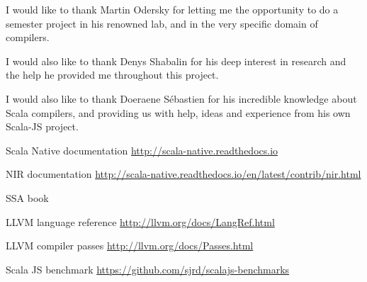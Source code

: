 \documentclass[12pt,a4paper]{article}
\begin{document}
I would like to thank Martin Odersky for letting me the opportunity to do a semester project in his renowned lab, and in the very specific domain of compilers.

I would also like to thank Denys Shabalin for his deep interest in research and the help he provided me throughout this project.

I would also like to thank Doeraene Sébastien for his incredible knowledge about Scala compilers, and providing us with help, ideas and experience from his own Scala-JS project.

\begin{thebibliography}{9}

    Scala Native documentation \newline \url{http://scala-native.readthedocs.io}

	 NIR documentation \newline \url{http://scala-native.readthedocs.io/en/latest/contrib/nir.html}
	
	 SSA book
	
	 LLVM language reference \newline \url{http://llvm.org/docs/LangRef.html}	
	
	 LLVM compiler passes \newline \url{http://llvm.org/docs/Passes.html}

	 Scala JS benchmark \newline \url{https://github.com/sjrd/scalajs-benchmarks}

\end{thebibliography}
\end{document}
